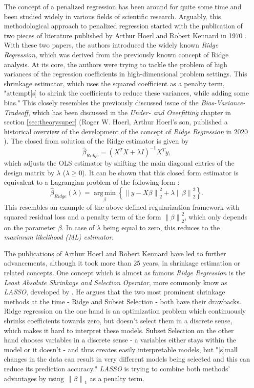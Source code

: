 \documentclass[12pt,a4paper]{article}
\newcommand{\norm}[1]{\left\lVert#1\right\rVert}
\DeclareMathOperator*{\argmin}{arg\,min}
\begin{document}
The concept of a penalized regression has been around for quite some time and been studied widely in various fields of scientific research. Arguably, this methodological approach to penalized regression started with the publication of two pieces of literature published by Arthur Hoerl and Robert Kennard in 1970 \parencite{HoerlKennard1970a, HoerlKennard1970b}. With these two papers, the authors introduced the widely known \textit{Ridge Regression}, which was derived from the previously known concept of Ridge analysis. At its core, the authors were trying to tackle the problem of high variances of the regression coefficients in high-dimensional problem settings. This shrinkage estimator, which uses the squared coefficient as a penalty term, "attempt[s] to shrink the coefficients to
reduce these variances, while adding some bias." \parencite{Hoerl2020} This closely resembles the previously discussed issue of the \textit{Bias-Variance-Tradeoff}, which has been discussed in the \textit{Under- and Overfitting} chapter in section \ref{sec:theorysuper} (Roger W. Hoerl, Arthur Hoerl's son, published a historical overview of the development of the concept of \textit{Ridge Regression} in 2020 \parencite{Hoerl2020}). The closed from solution of the Ridge estimator is given by
$$\hat{\beta}_{Ridge} = \left(X^TX+\lambda I\right)^{-1}X^Ty,$$
which adjusts the OLS estimator by shifting the main diagonal entries of the design matrix by $\lambda$ ($\lambda \geq 0$). It can be shown that this closed form estimator is equivalent to a Lagrangian problem of the following form \parencite{VanWieringen2015}:
$$\hat{\beta}_{Ridge}(\lambda) = \underset{\beta}{\argmin}\left\{\norm{y-X\beta}_2^2 + \lambda\norm{\beta}_2^2\right\}.$$
This resembles an example of the above defined regularization framework with squared residual loss and a penalty term of the form $\norm{\beta}_2^2$, which only depends on the parameter $\beta$. In case of $\lambda$ being equal to zero, this reduces to the \textit{maximum likelihood (ML) estimator}. 

The publications of Arthur Hoerl and Robert Kennard have led to further advancements, although it took more than 25 years, in shrinkage estimation or related concepts. One concept which is almost as famous \textit{Ridge Regression} is the \textit{Least Absolute Shrinkage and Selection Operator}, more commonly know as \textit{LASSO}, developed by \textcite{Tibishirani1996}. He argues that the two most prominent shrinkage methods at the time - Ridge and Subset Selection - both have their drawbacks. Ridge regression on the one hand is an optimization problem which continuously shrinks coefficients towards zero, but doesn't select them in a discrete sense, which makes it hard to interpret these models. Subset Selection on the other hand chooses variables in a discrete sense - a variables either stays within the model or it doesn't - and thus creates easily interpretable models, but "[s]mall changes in the data can result in very different models being selected and this can reduce its prediction accuracy." \parencite{Tibishirani1996} \textit{LASSO} is trying to combine both methods' advantages by using $\norm{\beta}_1$ as a penalty term.\\
\end{document}
